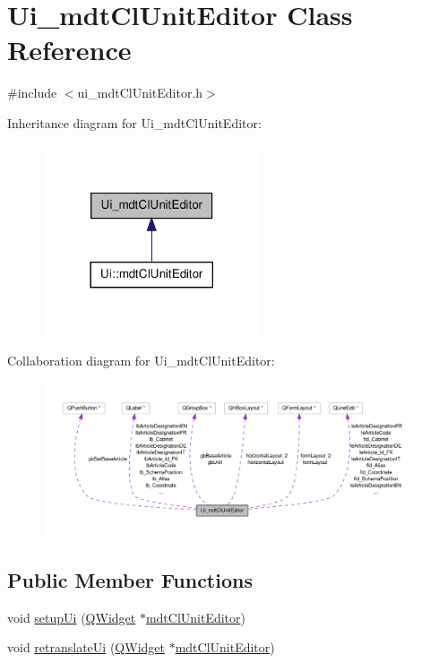 \hypertarget{class_ui__mdt_cl_unit_editor}{\section{Ui\-\_\-mdt\-Cl\-Unit\-Editor Class Reference}
\label{class_ui__mdt_cl_unit_editor}
}


{\ttfamily \#include $<$ui\-\_\-mdt\-Cl\-Unit\-Editor.\-h$>$}



Inheritance diagram for Ui\-\_\-mdt\-Cl\-Unit\-Editor\-:
\nopagebreak
\begin{figure}[H]
\begin{center}
\leavevmode
\includegraphics[width=182pt]{class_ui__mdt_cl_unit_editor__inherit__graph}
\end{center}
\end{figure}


Collaboration diagram for Ui\-\_\-mdt\-Cl\-Unit\-Editor\-:
\nopagebreak
\begin{figure}[H]
\begin{center}
\leavevmode
\includegraphics[width=350pt]{class_ui__mdt_cl_unit_editor__coll__graph}
\end{center}
\end{figure}
\subsection*{Public Member Functions}
\begin{DoxyCompactItemize}
\item 
void \hyperlink{class_ui__mdt_cl_unit_editor_ac61041694ebae670c38887a1f4bb3246}{setup\-Ui} (\hyperlink{class_q_widget}{Q\-Widget} $\ast$\hyperlink{classmdt_cl_unit_editor}{mdt\-Cl\-Unit\-Editor})
\item 
void \hyperlink{class_ui__mdt_cl_unit_editor_a51f845530874a93db65a9052ccbb2aa8}{retranslate\-Ui} (\hyperlink{class_q_widget}{Q\-Widget} $\ast$\hyperlink{classmdt_cl_unit_editor}{mdt\-Cl\-Unit\-Editor})
\end{DoxyCompactItemize}

